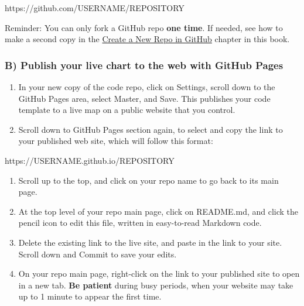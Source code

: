 \documentclass[
  english,
]{book}
\newenvironment{Shaded}{\begin{snugshade}}{\end{snugshade}}
\newcommand{\NormalTok}[1]{#1}
\begin{document}
\begin{Shaded}
\begin{Highlighting}[]
\NormalTok{https://github.com/USERNAME/REPOSITORY}
\end{Highlighting}
\end{Shaded}

Reminder: You can only fork a GitHub repo \textbf{one time}. If needed, see how to make a second copy in the \href{create-repo}{Create a New Repo in GitHub} chapter in this book.

\hypertarget{b-publish-your-live-chart-to-the-web-with-github-pages}{%
\subsubsection*{B) Publish your live chart to the web with GitHub Pages}\label{b-publish-your-live-chart-to-the-web-with-github-pages}}

\begin{enumerate}
\def\labelenumi{\arabic{enumi})}
\setcounter{enumi}{3}
\item
  In your new copy of the code repo, click on Settings, scroll down to the GitHub Pages area, select Master, and Save. This publishes your code template to a live map on a public website that you control.
\item
  Scroll down to GitHub Pages section again, to select and copy the link to your published web site, which will follow this format:
\end{enumerate}

\begin{Shaded}
\begin{Highlighting}[]
\NormalTok{https://USERNAME.github.io/REPOSITORY}
\end{Highlighting}
\end{Shaded}

\begin{enumerate}
\def\labelenumi{\arabic{enumi})}
\setcounter{enumi}{5}
\item
  Scroll up to the top, and click on your repo name to go back to its main page.
\item
  At the top level of your repo main page, click on README.md, and click the pencil icon to edit this file, written in easy-to-read Markdown code.
\item
  Delete the existing link to the live site, and paste in the link to your site. Scroll down and Commit to save your edits.
\item
  On your repo main page, right-click on the link to your published site to open in a new tab. \textbf{Be patient} during busy periods, when your website may take up to 1 minute to appear the first time.
\end{enumerate}
\end{document}
